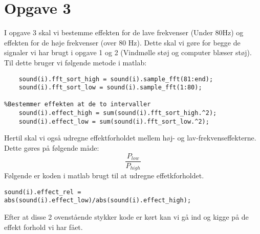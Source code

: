 \documentclass[../main.tex]{subfiles}
\begin{document}
\section{Opgave 3}
I opgave 3 skal vi bestemme effekten for de lave frekvenser (Under 80Hz) og effekten for de høje frekvenser (over 80 Hz).
Dette skal vi gøre for begge de signaler vi har brugt i opgave 1 og 2 (Vindmølle støj og computer blæser støj).
Til dette bruger vi følgende metode i matlab:

\begin{lstlisting}[caption=Udregning af frekvens effekter, label=lst:freqEffect]
%Opstiller frekvenser over 80 H< og under 80Hz
    sound(i).fft_sort_high = sound(i).sample_fft(81:end);
    sound(i).fft_sort_low = sound(i).sample_fft(1:80);

%Bestemmer effekten at de to intervaller
    sound(i).effect_high = sum(sound(i).fft_sort_high.^2);
    sound(i).effect_low = sum(sound(i).fft_sort_low.^2);
\end{lstlisting}

Hertil skal vi også udregne effektforholdet mellem høj- og lav-frekvenseffekterne. 
Dette gøres på følgende måde:
\[
    \frac{P_{low}}{P_{high}}
\]
Følgende er koden i matlab brugt til at udregne effetkforholdet.
\begin{lstlisting}[caption=Udregning af effektforhold, label=lst:effectRel]
% Calculate the effekt relation
sound(i).effect_rel = abs(sound(i).effect_low)/abs(sound(i).effect_high);
\end{lstlisting}

Efter at disse 2 ovenstående stykker kode er kørt kan vi gå ind og kigge på de effekt forhold vi har fået.

\begin{table}[h]
    \centering
    \caption{Tabel over frekvenseffekter og effektforhold}
    \label{tab:effectTabel}
\end{table}
\end{document}
